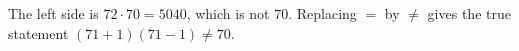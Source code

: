 The left side is $72\cdot70=5040$, which is not $70$. Replacing $=$ by $\ne$ gives the true statement $\boxed{(71+1)(71-1)\ne70}$.
